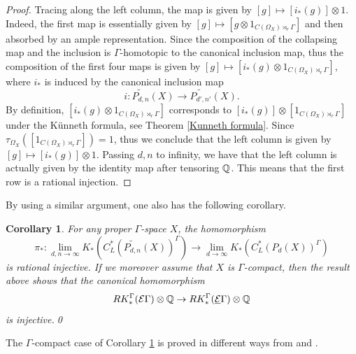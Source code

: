 \documentclass[11pt]{article}
\theoremstyle{definition}
\theoremstyle{plain}
\newtheorem{Cor}[Def]{Corollary}
\def\MRdnX{\widetilde{P_{d,n}}(X)}
\def\ox{\otimes}
\def\ox{\otimes}
\def\EG{\underline{\E}\Gamma}
\def\Ga{\Gamma}
\begin{document}
\begin{proof}
Tracing along the left column, the map is given by $[g]\mapsto [i_*(g)]\ox 1$. Indeed, the first map is essentially given by $[g]\mapsto[g\ox 1_{C(\Omega_X)\rtimes_r\Ga}]$ and then absorbed by an ample representation. Since the composition of the collapsing map and the inclusion is $\Ga$-homotopic to the canonical inclusion map, thus the composition of the first four maps is given by $[g]\mapsto [i_*(g)\ox 1_{C(\Omega_X)\rtimes_r\Ga}]$, where $i_*$ is induced by the canonical inclusion map
$$i:\widetilde{P_{d,n}}(X)\to \widetilde{P_{d',n'}}(X).$$
By definition, $[i_*(g)\ox 1_{C(\Omega_X)\rtimes_r\Ga}]$ corresponds to $[i_*(g)]\ox[1_{C(\Omega_X)\rtimes_r\Ga}]$ under the K\"unneth formula, see Theorem \ref{Kunneth formula}. Since $\tau_{\Omega_X}\left([1_{C(\Omega_X)\rtimes_r\Ga}]\right)=1$, thus we conclude that the left column is given by $[g]\mapsto [i_*(g)]\ox 1$. Passing $d,n$ to infinity, we have that the left column is actually given by the identity map after tensoring $\mathbb Q$. This means that the first row is a rational injection.
\end{proof}

By using a similar argument, one also has the following corollary.

\begin{Cor}\label{inj between classifying}
For any proper $\Ga$-space $X$, the homomorphism
$$\pi_*:\lim_{d,n\to\infty}K_*(C^*_L(\MRdnX)^{\Ga})\to \lim_{d\to\infty}K_*(C^*_L(P_d(X))^{\Ga})$$
is rational injective. If we moreover assume that $X$ is $\Ga$-compact, then the result above shows that the canonical homomorphism
$$RK^{\Ga}_*(\E\Ga)\ox\IQ\to RK^{\Ga}_*(\EG)\ox\IQ$$
is injective.\qed
\end{Cor}

The $\Ga$-compact case of Corollary \ref{inj between classifying} is proved in different ways from \cite{BC1988} and \cite{AAS2020}.
\end{document}
